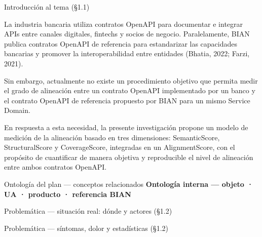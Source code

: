 \documentclass[aspectratio=169,11pt,spanish]{beamer}
\begin{document}
\begin{frame}{Introducción al tema (§1.1)}
  \marcadorNoExponer
  \begin{planpanel}
  \small
  La industria bancaria utiliza contratos OpenAPI para documentar e integrar APIs entre canales digitales, fintechs y socios de negocio. Paralelamente, BIAN publica contratos OpenAPI de referencia para estandarizar las capacidades bancarias y promover la interoperabilidad entre entidades (Bhatia, 2022; Farzi, 2021).

  \vspace{0.35em}
  Sin embargo, actualmente no existe un procedimiento objetivo que permita medir el grado de alineación entre un contrato OpenAPI implementado por un banco y el contrato OpenAPI de referencia propuesto por BIAN para un mismo Service Domain.

  \vspace{0.35em}
  En respuesta a esta necesidad, la presente investigación propone un modelo de medición de la alineación basado en tres dimensiones: SemanticScore, StructuralScore y CoverageScore, integradas en un AlignmentScore, con el propósito de cuantificar de manera objetiva y reproducible el nivel de alineación entre ambos contratos OpenAPI.
  \end{planpanel}
\end{frame}

\begin{frame}{Ontología del plan --- conceptos relacionados}
  \marcadorNoExponer
  \vspace{0.05em}
  {\normalsize\bfseries\textcolor{uninavy}{Ontología interna --- objeto · UA · producto · referencia BIAN}}
\end{frame}

\begin{frame}{Problemática --- situación real: dónde y actores (§1.2)}
\end{frame}

\begin{frame}{Problemática --- síntomas, dolor y estadísticas (§1.2)}
\end{frame}
\end{document}
